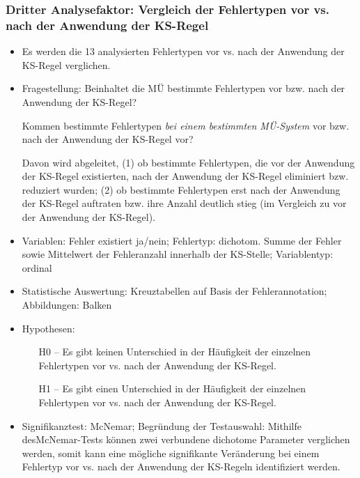 \subsubsection{Dritter Analysefaktor: Vergleich der Fehlertypen vor vs. nach der Anwendung der KS-Regel}

\begin{itemize}
\item Es werden die 13 analysierten Fehlertypen vor vs. nach der Anwendung der KS-Regel verglichen.
\item Fragestellung: Beinhaltet die MÜ bestimmte Fehlertypen vor bzw. nach der Anwendung der KS-Regel?

Kommen bestimmte Fehlertypen \textit{bei einem bestimmten MÜ-System} vor bzw. nach der Anwendung der KS-Regel vor?

Davon wird abgeleitet, (1) ob bestimmte Fehlertypen, die vor der Anwendung der KS-Regel existierten, nach der Anwendung der KS-Regel eliminiert bzw. reduziert wurden; (2) ob bestimmte Fehlertypen erst nach der Anwendung der KS-Regel auftraten bzw. ihre Anzahl deutlich stieg (im Vergleich zu vor der Anwendung der KS-Regel).

\item Variablen: Fehler existiert ja/nein; Fehlertyp: dichotom. Summe der Fehler sowie Mittelwert der Fehleranzahl innerhalb der KS-Stelle; Variablentyp: ordinal
\item Statistische Auswertung: Kreuztabellen auf Basis der Fehlerannotation; Abbildungen: Balken
\item Hypothesen:

  \begin{itemize}[align=left]

  \item[H0 --] Es gibt keinen Unterschied in der Häufigkeit der einzelnen Fehlertypen vor vs. nach der Anwendung der KS-Regel.

  \item[H1 --] Es gibt einen Unterschied in der Häufigkeit der einzelnen Fehlertypen vor vs. nach der Anwendung der KS-Regel.

  \end{itemize}

\item Signifikanztest: McNemar; Begründung der Testauswahl: Mithilfe des\linebreak McNemar-Tests können zwei verbundene dichotome Parameter verglichen werden, somit kann eine mögliche signifikante Veränderung bei einem Fehlertyp vor vs. nach der Anwendung der KS-Regeln identifiziert werden.
\end{itemize}

